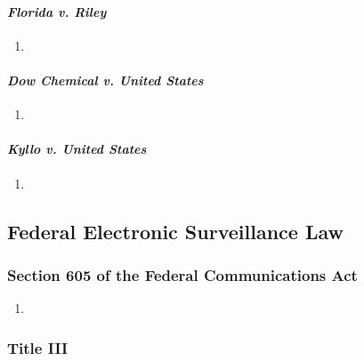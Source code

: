 \paragraph{\emph{Florida v. Riley}} %

\begin{enumerate}
    \item 
\end{enumerate}

\paragraph{\emph{Dow Chemical v. United States}} %



\begin{enumerate}
    \item 
\end{enumerate}

\paragraph{\emph{Kyllo v. United States}} %


\begin{enumerate}
    \item 
\end{enumerate}


\subsection{Federal Electronic Surveillance Law}

\subsubsection{Section 605 of the Federal Communications Act}

\begin{enumerate}
    \item %
\end{enumerate}

\subsubsection{Title III}

